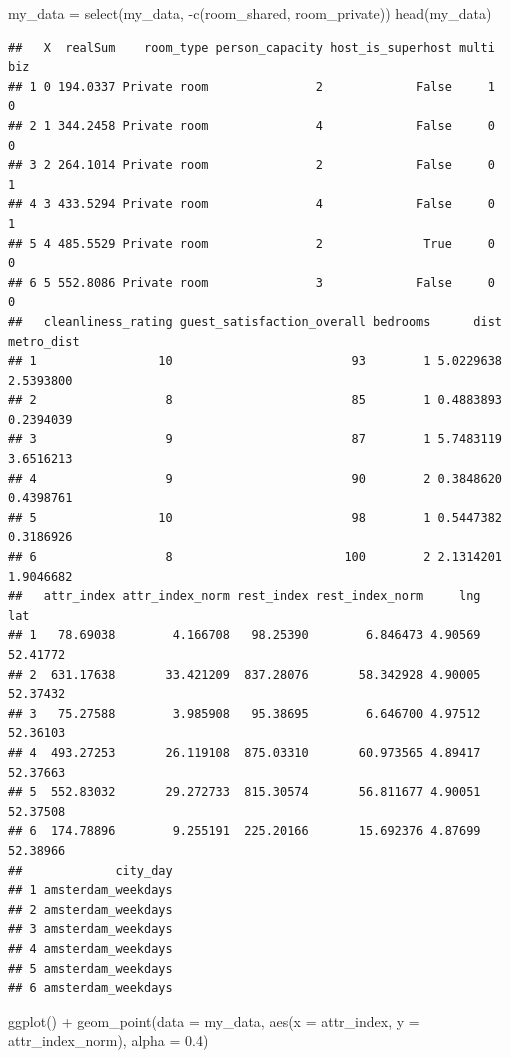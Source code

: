 \documentclass[
]{article}
\newenvironment{Shaded}{\begin{snugshade}}{\end{snugshade}}
\newcommand{\AttributeTok}[1]{\textcolor[rgb]{0.77,0.63,0.00}{#1}}
\newcommand{\FloatTok}[1]{\textcolor[rgb]{0.00,0.00,0.81}{#1}}
\newcommand{\FunctionTok}[1]{\textcolor[rgb]{0.00,0.00,0.00}{#1}}
\newcommand{\NormalTok}[1]{#1}
\newcommand{\OtherTok}[1]{\textcolor[rgb]{0.56,0.35,0.01}{#1}}
\newcommand{\SpecialCharTok}[1]{\textcolor[rgb]{0.00,0.00,0.00}{#1}}
\begin{document}
\begin{Shaded}
\begin{Highlighting}[]
\NormalTok{my\_data }\OtherTok{=} \FunctionTok{select}\NormalTok{(my\_data, }\SpecialCharTok{{-}}\FunctionTok{c}\NormalTok{(room\_shared, room\_private))}
\FunctionTok{head}\NormalTok{(my\_data)}
\end{Highlighting}
\end{Shaded}

\begin{verbatim}
##   X  realSum    room_type person_capacity host_is_superhost multi biz
## 1 0 194.0337 Private room               2             False     1   0
## 2 1 344.2458 Private room               4             False     0   0
## 3 2 264.1014 Private room               2             False     0   1
## 4 3 433.5294 Private room               4             False     0   1
## 5 4 485.5529 Private room               2              True     0   0
## 6 5 552.8086 Private room               3             False     0   0
##   cleanliness_rating guest_satisfaction_overall bedrooms      dist metro_dist
## 1                 10                         93        1 5.0229638  2.5393800
## 2                  8                         85        1 0.4883893  0.2394039
## 3                  9                         87        1 5.7483119  3.6516213
## 4                  9                         90        2 0.3848620  0.4398761
## 5                 10                         98        1 0.5447382  0.3186926
## 6                  8                        100        2 2.1314201  1.9046682
##   attr_index attr_index_norm rest_index rest_index_norm     lng      lat
## 1   78.69038        4.166708   98.25390        6.846473 4.90569 52.41772
## 2  631.17638       33.421209  837.28076       58.342928 4.90005 52.37432
## 3   75.27588        3.985908   95.38695        6.646700 4.97512 52.36103
## 4  493.27253       26.119108  875.03310       60.973565 4.89417 52.37663
## 5  552.83032       29.272733  815.30574       56.811677 4.90051 52.37508
## 6  174.78896        9.255191  225.20166       15.692376 4.87699 52.38966
##             city_day
## 1 amsterdam_weekdays
## 2 amsterdam_weekdays
## 3 amsterdam_weekdays
## 4 amsterdam_weekdays
## 5 amsterdam_weekdays
## 6 amsterdam_weekdays
\end{verbatim}

\begin{Shaded}
\begin{Highlighting}[]
\FunctionTok{ggplot}\NormalTok{() }\SpecialCharTok{+} \FunctionTok{geom\_point}\NormalTok{(}\AttributeTok{data =}\NormalTok{ my\_data, }\FunctionTok{aes}\NormalTok{(}\AttributeTok{x =}\NormalTok{ attr\_index, }\AttributeTok{y =}\NormalTok{ attr\_index\_norm),}
    \AttributeTok{alpha =} \FloatTok{0.4}\NormalTok{)}
\end{Highlighting}
\end{Shaded}
\end{document}
